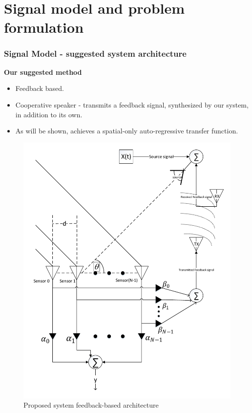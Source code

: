 \documentclass[10pt,pdflatex,headrule,landscape]{beamer}
\begin{document}
\section{Signal model and problem formulation}

\begin{frame}
\frametitle{Signal Model - suggested system architecture}
\begin{minipage}{0.45\textwidth}
\textbf{Our suggested method}
\begin{itemize}
\item
{
Feedback based.
}
\item
{
Cooperative speaker - transmits a feedback signal, synthesized by our system, in addition to its own.
}
\item
{
As will be shown, achieves a spatial-only auto-regressive transfer function.
}
\end{itemize}
\end{minipage}
\begin{minipage}{0.44\textwidth}
\begin{figure}
\includegraphics[width=\textwidth]{./Media/SpatialIIR-diagram/SpatialIIR_VER4.pdf}
\caption{Proposed system feedback-based architecture}
\label{fig:SpatialIIRSuggestedArch}
\end{figure}
\end{minipage}
\end{frame}
\end{document}
